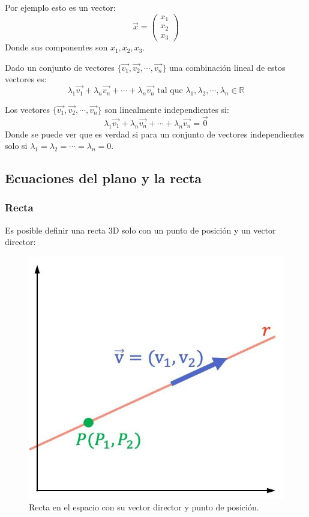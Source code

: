 \documentclass[arial,a4paper,print]{article}
\begin{document}
Por ejemplo esto es un vector:
\begin{equation*}
	\vec{x} = 
	\begin{pmatrix}
		x_{1} \\ x_{2} \\ x_{3}
	\end{pmatrix}
\end{equation*}
Donde sus componentes son $x_{1}, x_{2}, x_{3}$. 

Dado un conjunto de vectores $\{\vec{v_{1}}, \vec{v_{2}}, \cdots, \vec{v_{n}}\}$ una combinación lineal de estos vectores es:
\begin{equation*}
	\lambda_{1}\vec{v_{1}} +  \lambda_{n}\vec{v_{n}} + \cdots + \lambda_{n}\vec{v_{n}} \text{ tal que } \lambda_{1},\lambda_{2}, \cdots, \lambda_{n} \in \mathbb{R}
\end{equation*}

Los vectores $\{\vec{v_{1}}, \vec{v_{2}}, \cdots, \vec{v_{n}}\}$ son linealmente independientes si:
\begin{equation*}
	\lambda_{1}\vec{v_{1}} +  \lambda_{n}\vec{v_{n}} + \cdots + \lambda_{n}\vec{v_{n}} = \vec{0}
\end{equation*}
Donde se puede ver que es verdad si para un conjunto de vectores independientes solo si $\lambda_{1} = \lambda_{2} = \cdots = \lambda_{n} = 0$. 

\subsection{Ecuaciones del plano y la recta}
\subsubsection{Recta}
Es posible definir una recta 3D solo con un punto de posición y un vector director:
\begin{figure}[H]
	\centering
	\includegraphics[width=0.3\linewidth]{figures/ecuaciones-de-la-recta}
	\caption{Recta en el espacio con su vector director y punto de posición.}
	\label{fig:ecuaciones-de-la-recta}
\end{figure}
\end{document}
